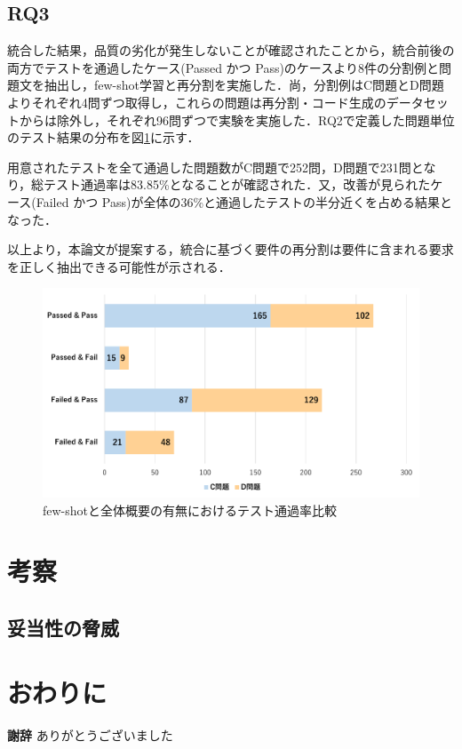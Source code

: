 \documentclass[submit,techrep,noauthor]{ipsj}
\begin{document}
\subsection{RQ3}
統合した結果，品質の劣化が発生しないことが確認されたことから，統合前後の両方でテストを通過したケース(Passed かつ Pass)のケースより8件の分割例と問題文を抽出し，few-shot学習と再分割を実施した．尚，分割例はC問題とD問題よりそれぞれ4問ずつ取得し，これらの問題は再分割・コード生成のデータセットからは除外し，それぞれ96問ずつで実験を実施した．RQ2で定義した問題単位のテスト結果の分布を図\ref{rq3_1}に示す．

用意されたテストを全て通過した問題数がC問題で252問，D問題で231問となり，総テスト通過率は83.85\%となることが確認された．又，改善が見られたケース(Failed かつ Pass)が全体の36\%と通過したテストの半分近くを占める結果となった．

以上より，本論文が提案する，統合に基づく要件の再分割は要件に含まれる要求を正しく抽出できる可能性が示される．

\begin{figure}[t]
    \centering
    \includegraphics[width=1.0\linewidth]{./Toyoshima_fig/RQ3_1.pdf}
    \caption{few-shotと全体概要の有無におけるテスト通過率比較\protect\footnotemark}
    \label{rq3_1}
\end{figure}

\section{考察}
\label{sec:discussion}
%
\subsection{妥当性の脅威}

\section{おわりに}
\label{sec:conclusion}

\textbf{謝辞} ありがとうございました



\end{document}
